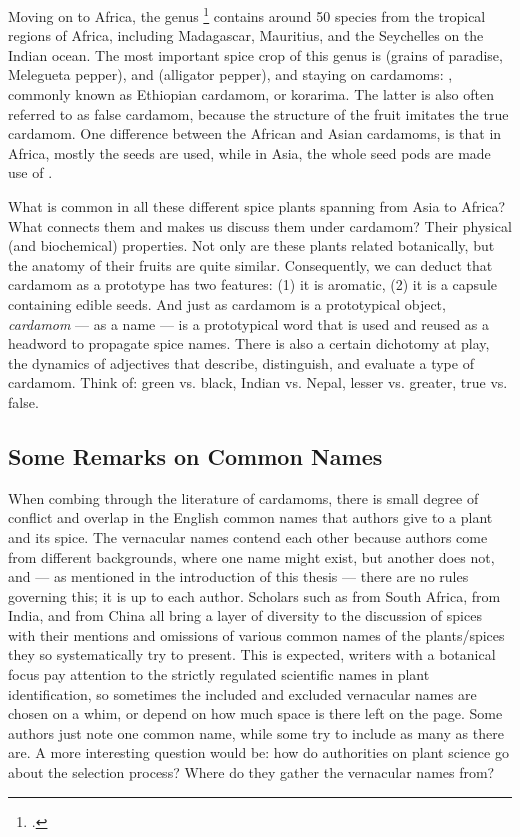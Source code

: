 Moving on to Africa, the genus \footcite[Aframomum K.Schum. ]{gbif} contains around 50 species from the tropical regions of Africa, including Madagascar, Mauritius, and the Seychelles on the Indian ocean. The most important spice crop of this genus is  (grains of paradise, Melegueta pepper), and  (alligator pepper), and staying on cardamoms: , commonly known as Ethiopian cardamom, or korarima. The latter is also often referred to as false cardamom, because the structure of the fruit imitates the true cardamom. One difference between the African and Asian cardamoms, is that in Africa, mostly the seeds are used, while in Asia, the whole seed pods are made use of \autocite{van_wyk_culinary_2014}.



What is common in all these different spice plants spanning from Asia to Africa? What connects them and makes us discuss them under cardamom? Their physical (and biochemical) properties. Not only are these plants related botanically, but the anatomy of their fruits are quite similar. Consequently, we can deduct that cardamom as a prototype has two features: (1) it is aromatic, (2) it is a capsule containing edible seeds. And just as cardamom is a prototypical object, \textit{cardamom} --- as a name --- is a prototypical word that is used and reused as a headword to propagate spice names. There is also a certain dichotomy at play, the dynamics of adjectives that describe, distinguish, and evaluate a type of cardamom. Think of: green vs. black, Indian vs. Nepal, lesser vs. greater, true vs. false.

\subsection{Some Remarks on Common Names}

When combing through the literature of cardamoms, there is small degree of conflict and overlap in the English common names that authors give to a plant and its spice. The vernacular names contend each other because authors come from different backgrounds, where one name might exist, but another does not, and --- as mentioned in the introduction of this thesis --- there are no rules governing this; it is up to each author. Scholars such as \citeauthor{van_wyk_culinary_2014} from South Africa, \citeauthor{ravindran_cardamom_2002} from India, and \citeauthor{hu_food_2005} from China all bring a layer of diversity to the discussion of spices with their mentions and omissions of various common names of the plants/spices they so systematically try to present. This is expected, writers with a botanical focus pay attention to the strictly regulated scientific names in plant identification, so sometimes the included and excluded vernacular names are chosen on a whim, or depend on how much space is there left on the page. Some authors just note one common name, while some try to include as many as there are. A more interesting question would be: how do authorities on plant science go about the selection process? Where do they gather the vernacular names from?

